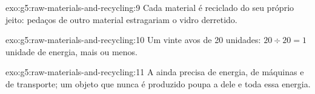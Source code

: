 \begin{solution}{exo:g5:raw-materials-and-recycling:9}
Cada material é reciclado do seu próprio jeito: pedaços de outro
material estragariam o vidro derretido.
\end{solution}

\begin{solution}{exo:g5:raw-materials-and-recycling:10}
Um vinte avos de 20 unidades: $20 \div 20 = 1$ unidade de energia, mais ou menos.
\end{solution}

\begin{solution}{exo:g5:raw-materials-and-recycling:11}
A  ainda precisa de energia, de máquinas e de transporte; um
objeto que nunca é produzido poupa a  dele e toda essa
energia.
\end{solution}
